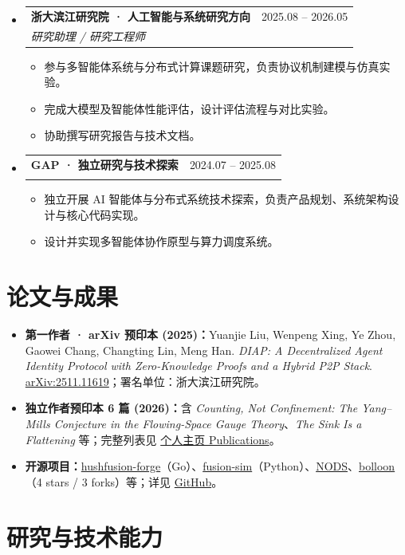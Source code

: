 \documentclass[10pt,a4paper]{article}
\makeatletter
\newcommand{\resumeItem}[1]{\item \small #1}
\newcommand{\resumeSubheading}[4]{
  \item
  \begin{tabular*}{0.97\textwidth}{l@{\extracolsep{\fill}}r}
    \textbf{#1} & #2 \\
    \textit{\small #3} & \textit{\small #4} \\
  \end{tabular*}
}
\makeatother
\begin{document}
\begin{itemize}[leftmargin=0.15in, label={}, topsep=2pt]

\resumeSubheading{浙大滨江研究院 · 人工智能与系统研究方向}{2025.08 -- 2026.05}{研究助理 / 研究工程师}{}
\begin{itemize}[topsep=1pt, label=\textbullet]
\resumeItem{参与多智能体系统与分布式计算课题研究，负责协议机制建模与仿真实验。}
\resumeItem{完成大模型及智能体性能评估，设计评估流程与对比实验。}
\resumeItem{协助撰写研究报告与技术文档。}
\end{itemize}

\resumeSubheading{GAP · 独立研究与技术探索}{2024.07 -- 2025.08}{}{}
\begin{itemize}[topsep=1pt, label=\textbullet]
\resumeItem{独立开展 AI 智能体与分布式系统技术探索，负责产品规划、系统架构设计与核心代码实现。}
\resumeItem{设计并实现多智能体协作原型与算力调度系统。}
\end{itemize}

\end{itemize}

\section{论文与成果}

\begin{itemize}[leftmargin=0.15in, topsep=2pt]
\resumeItem{\textbf{第一作者 · arXiv 预印本 (2025)：}Yuanjie Liu, Wenpeng Xing, Ye Zhou, Gaowei Chang, Changting Lin, Meng Han. \emph{DIAP: A Decentralized Agent Identity Protocol with Zero-Knowledge Proofs and a Hybrid P2P Stack}. \href{https://arxiv.org/abs/2511.11619}{arXiv:2511.11619}；署名单位：浙大滨江研究院。}
\resumeItem{\textbf{独立作者预印本 6 篇 (2026)：}含 \emph{Counting, Not Confinement: The Yang--Mills Conjecture in the Flowing-Space Gauge Theory}、\emph{The Sink Is a Flattening} 等；完整列表见 \href{https://logos-42.github.io/publications/}{个人主页 Publications}。}
\resumeItem{\textbf{开源项目：}\href{https://github.com/logos-42/hushfusion-forge}{hushfusion-forge}（Go）、\href{https://github.com/logos-42/fusion-sim}{fusion-sim}（Python）、\href{https://github.com/logos-42/NODS}{NODS}、\href{https://github.com/logos-42/bolloon}{bolloon}（4 stars / 3 forks）等；详见 \href{https://github.com/logos-42}{GitHub}。}
\end{itemize}

\section{研究与技术能力}
\end{document}
